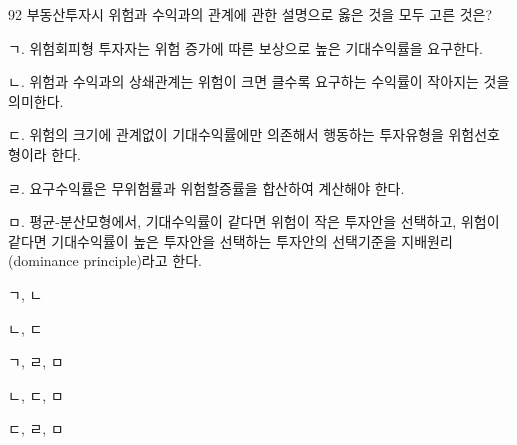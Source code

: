 \begin{question}{92}
부동산투자시 위험과 수익과의 관계에 관한 설명으로 옳은 것을 모두 고른 것은?
\begin{framedtext}
ㄱ. 위험회피형 투자자는 위험 증가에 따른 보상으로 높은 기대수익률을 요구한다. \par
ㄴ. 위험과 수익과의 상쇄관계는 위험이 크면 클수록 요구하는 수익률이 작아지는 것을 의미한다. \par
ㄷ. 위험의 크기에 관계없이 기대수익률에만 의존해서 행동하는 투자유형을 위험선호형이라 한다. \par
ㄹ. 요구수익률은 무위험률과 위험할증률을 합산하여 계산해야 한다. \par
ㅁ. 평균-분산모형에서, 기대수익률이 같다면 위험이 작은 투자안을 선택하고, 위험이 같다면 기대수익률이 높은 투자안을 선택하는 투자안의 선택기준을 지배원리(dominance principle)라고 한다.
\end{framedtext}
\begin{choices}
  \item ㄱ, ㄴ
  \item ㄴ, ㄷ
  \item ㄱ, ㄹ, ㅁ
  \item ㄴ, ㄷ, ㅁ
  \item ㄷ, ㄹ, ㅁ
\end{choices}
\end{question}

